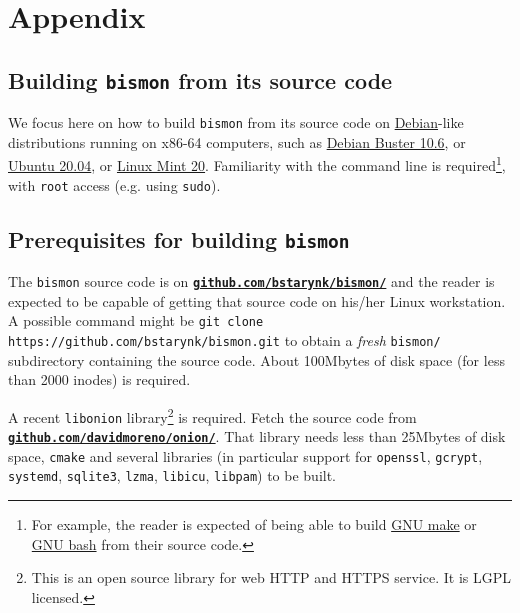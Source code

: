 \section{Appendix}
\label{sec:appendix}

\subsection{Building \texttt{bismon} from its source code}
\label{subsec:building-bismon}

We focus here on how to build \texttt{bismon} from its source code on
\href{http://debian.org/}{Debian}-like distributions running on
x86-64 computers, such as
\href{https://www.debian.org/releases/stable/}{Debian Buster 10.6}, or
\href{https://ubuntu.com/}{Ubuntu 20.04}, or
\href{https://linuxmint.com/}{Linux Mint 20}. Familiarity with the
command line is required\footnote{For example, the reader is expected
  of being able to build \href{https://www.gnu.org/software/make/}{GNU
    make} or \href{https://www.gnu.org/software/bash/}{GNU bash} from
  their source code.}, with \texttt{root} access (e.g. using
\texttt{sudo}).


\subsection{Prerequisites for building \texttt{bismon}}
\label{subsec:prereq-bismon}

The \texttt{bismon} source code is on
\href{https://github.com/bstarynk/bismon/}{\texttt{\textbf{github.com/bstarynk/bismon/}}}
and the reader is expected to be capable of getting that source code
on his/her Linux workstation. A possible command might be \texttt{git
  clone https://github.com/bstarynk/bismon.git} to obtain a
\emph{fresh} \texttt{bismon/} subdirectory containing the source
code. About 100Mbytes of disk space (for less than 2000 inodes) is
required.

A recent \texttt{libonion} library\footnote{This is an open source
library for web HTTP and HTTPS service. It is LGPL licensed.} is
required. Fetch the source code from
\href{https://github.com/davidmoreno/onion}{\texttt{\textbf{github.com/davidmoreno/onion/}}}. That
library needs less than 25Mbytes of disk space, \texttt{cmake} and
several libraries (in particular support for \texttt{openssl},
\texttt{gcrypt}, \texttt{systemd}, \texttt{sqlite3}, \texttt{lzma},
\texttt{libicu}, \texttt{libpam}) to be built.

